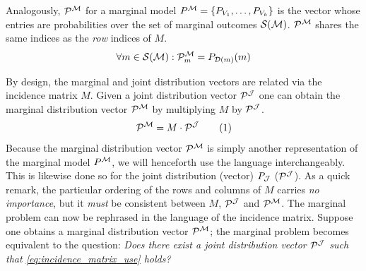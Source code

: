 \documentclass[aps, 10pt, english, twoside, pra, nofootinbib, tightenlines, longbibliography]{revtex4-1}
\renewcommand{\Events}[1]{\mathcal{S}\br{#1}} %
\begin{document}
    \begin{definition}
        Analogously,  $\probvec^{\mscenario}$ for a marginal model $\prob^{\mscenario} = \bc{P_{V_1}, \ldots, P_{V_k}}$ is the vector whose entries are probabilities over the set of marginal outcomes $\Events{\mscenario}$. $\probvec^{\mscenario}$ shares the same indices as the \textit{row} indices of $M$.
        \[ \forall m \in \Events{\mscenario} : \probvec^{\mscenario}_m = \prob[\Dom{m}][m] \]
    \end{definition}
    By design, the marginal and joint distribution vectors are related via the incidence matrix $M$. Given a joint distribution vector $\probvec^{\jointvar}$ one can obtain the marginal distribution vector $\probvec^{\mscenario}$ by multiplying $M$ by $\probvec^{\jointvar}$.
    \[ \probvec^{\mscenario} = M \cdot \probvec^{\jointvar} \eq \label{eq:incidence_matrix_use} \]
    Because the marginal distribution vector $\probvec^{\mscenario}$ is simply another representation of the marginal model $\prob^{\mscenario}$, we will henceforth use the language interchangeably. This is likewise done so for the joint distribution (vector) $\prob[\jointvar]$ ($\probvec^{\jointvar}$). As a quick remark, the particular ordering of the rows and columns of $M$ carries \textit{no importance}, but it \textit{must} be consistent between $M$, $\probvec^{\jointvar}$ and $\probvec^{\mscenario}$. The marginal problem can now be rephrased in the language of the incidence matrix. Suppose one obtains a marginal distribution vector $\probvec^{\mscenario}$; the marginal problem becomes equivalent to the question:
    \textit{Does there exist a joint distribution vector $\probvec^{\jointvar}$ such that \cref{eq:incidence_matrix_use} holds?}
\end{document}
